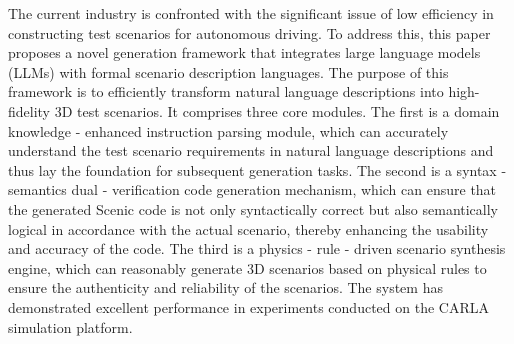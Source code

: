 \begin{abstracten}
	
The current industry is confronted with the significant issue of low efficiency in constructing test scenarios for autonomous driving. To address this, this paper proposes a novel generation framework that integrates large language models (LLMs) with formal scenario description languages. The purpose of this framework is to efficiently transform natural language descriptions into high-fidelity 3D test scenarios. It comprises three core modules. The first is a domain knowledge - enhanced instruction parsing module, which can accurately understand the test scenario requirements in natural language descriptions and thus lay the foundation for subsequent generation tasks. The second is a syntax - semantics dual - verification code generation mechanism, which can ensure that the generated Scenic code is not only syntactically correct but also semantically logical in accordance with the actual scenario, thereby enhancing the usability and accuracy of the code. The third is a physics - rule - driven scenario synthesis engine, which can reasonably generate 3D scenarios based on physical rules to ensure the authenticity and reliability of the scenarios. The system has demonstrated excellent performance in experiments conducted on the CARLA simulation platform.
	
\end{abstracten}